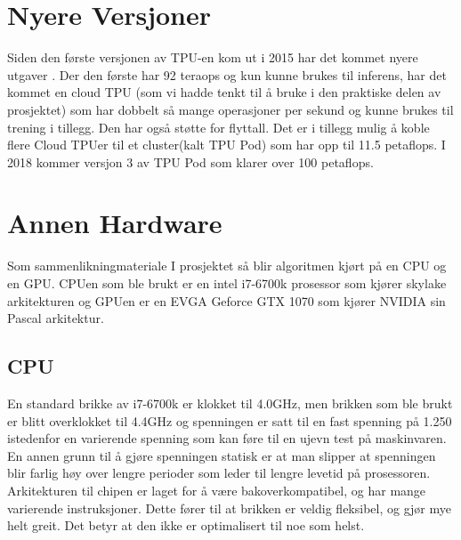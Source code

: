 \newpage
\section{Nyere Versjoner}
Siden den første versjonen av TPU-en kom ut i 2015 har det kommet nyere utgaver \cite{tpu_video}. Der den første har 92 teraops og kun kunne brukes til inferens, har det kommet en cloud TPU (som vi hadde tenkt til å bruke i den praktiske delen av prosjektet) som har dobbelt så mange operasjoner per sekund og kunne brukes til trening i tillegg. Den har også støtte for flyttall. Det er i tillegg mulig å koble flere Cloud TPUer til et cluster(kalt TPU Pod) som har opp til 11.5 petaflops. I 2018 kommer versjon 3 av TPU Pod som klarer over 100 petaflops.


\newpage
\section{Annen Hardware}
Som sammenlikningmateriale I prosjektet så blir algoritmen kjørt på en CPU og en GPU. CPUen som ble brukt er en intel i7-6700k prosessor som kjører skylake arkitekturen og GPUen er en EVGA  Geforce GTX 1070 som kjører NVIDIA sin Pascal arkitektur.

\subsection{CPU}
En standard brikke av i7-6700k er klokket til 4.0GHz, men brikken som ble brukt er blitt overklokket til 4.4GHz og spenningen er satt til en fast spenning på 1.250 istedenfor en varierende spenning som kan føre til en ujevn test på maskinvaren. En annen grunn til å gjøre spenningen statisk er at man slipper at spenningen blir farlig høy over lengre perioder som leder til lengre levetid på prosessoren.\newline
Arkitekturen til chipen er laget for å være bakoverkompatibel, og har mange varierende instruksjoner. Dette fører til at brikken er veldig fleksibel, og gjør mye helt greit. Det betyr at den ikke er optimalisert til noe som helst.


